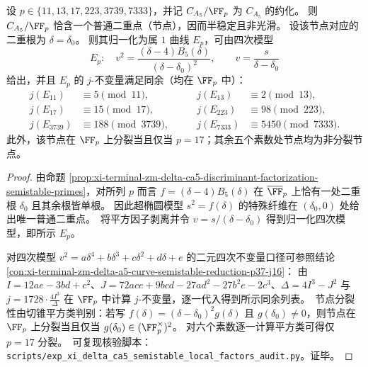 \begin{theorem}\label{thm:xi-terminal-zm-delta-ca5-nodal-semistable-j}
设 \(p\in\{11,13,17,223,3739,7333\}\)，并记 \(C_{A_5}/\FF_p\) 为 \(C_{A_5}\) 的约化。
则 \(C_{A_5}/\FF_p\) 恰含一个普通二重点（节点），因而半稳定且非光滑。
设该节点对应的二重根为 \(\delta=\delta_0\)。
则其归一化为属 \(1\) 曲线 \(E_p\)，可由四次模型
\[
E_p:\quad
v^2=\frac{(\delta-4)B_5(\delta)}{(\delta-\delta_0)^2},
\qquad
v=\frac{s}{\delta-\delta_0}
\]
给出，并且 \(E_p\) 的 \(j\)-不变量满足同余（均在 \(\FF_p\) 中）：
\[
\begin{aligned}
j(E_{11})&\equiv 5\pmod{11},\qquad
&j(E_{13})&\equiv 2\pmod{13},\\
j(E_{17})&\equiv 15\pmod{17},\qquad
&j(E_{223})&\equiv 98\pmod{223},\\
j(E_{3739})&\equiv 188\pmod{3739},\qquad
&j(E_{7333})&\equiv 5450\pmod{7333}.
\end{aligned}
\]
此外，该节点在 \(\FF_p\) 上分裂当且仅当 \(p=17\)；其余五个素数处节点均为非分裂节点。
\end{theorem}
\begin{proof}
由命题 \ref{prop:xi-terminal-zm-delta-ca5-discriminant-factorization-semistable-primes}，对所列 \(p\) 而言 \(f=(\delta-4)B_5(\delta)\) 在 \(\overline{\FF}_p\) 上恰有一处二重根 \(\delta_0\) 且其余根皆单根。
因此超椭圆模型 \(s^2=f(\delta)\) 的特殊纤维在 \((\delta_0,0)\) 处给出唯一普通二重点。\
将平方因子剥离并令 \(v=s/(\delta-\delta_0)\) 得到归一化四次模型，即所示 \(E_p\)。
\par
对四次模型 \(v^2=a\delta^4+b\delta^3+c\delta^2+d\delta+e\) 的二元四次不变量口径可参照结论 \ref{con:xi-terminal-zm-delta-a5-curve-semistable-reduction-p37-j16}：
由 \(I=12ae-3bd+c^2\)、\(J=72ace+9bcd-27ad^2-27b^2e-2c^3\)、\(\Delta=4I^3-J^2\) 与
\(
j=1728\cdot \frac{4I^3}{\Delta}
\)
在 \(\FF_p\) 中计算 \(j\)-不变量，逐一代入得到所示同余列表。\
节点分裂性由切锥平方类判别：若写 \(f(\delta)=(\delta-\delta_0)^2g(\delta)\) 且 \(g(\delta_0)\neq 0\)，则节点在 \(\FF_p\) 上分裂当且仅当 \(g(\delta_0)\in(\FF_p^\times)^2\)。
对六个素数逐一计算平方类可得仅 \(p=17\) 分裂。\
可复现核验脚本：\texttt{scripts/exp\_xi\_delta\_ca5\_semistable\_local\_factors\_audit.py}。证毕。
\end{proof}

